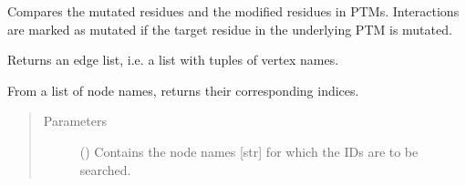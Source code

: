 \documentclass[letterpaper,10pt,english]{sphinxmanual}
\begin{document}
\begin{fulllineitems}
\begin{fulllineitems}
\end{fulllineitems}


\begin{fulllineitems}
\label{\detokenize{reference:pypath.main.PyPath.mimp_directions}}
\end{fulllineitems}


\begin{fulllineitems}
\label{\detokenize{reference:pypath.main.PyPath.mutated_edges}}
Compares the mutated residues and the modified residues in PTMs.
Interactions are marked as mutated if the target residue in the
underlying PTM is mutated.

\end{fulllineitems}


\begin{fulllineitems}
\label{\detokenize{reference:pypath.main.PyPath.name_edgelist}}
Returns an edge list, i.e. a list with tuples of vertex names.

\end{fulllineitems}


\begin{fulllineitems}
\label{\detokenize{reference:pypath.main.PyPath.names2vids}}
From a list of node names, returns their corresponding indices.
\begin{quote}\begin{description}
\item[{Parameters}] \leavevmode
{} () \textendash{} Contains the node names {[}str{]} for which the IDs are to be
searched.


\end{description}
\end{quote}
\end{fulllineitems}
\end{fulllineitems}
\end{document}
